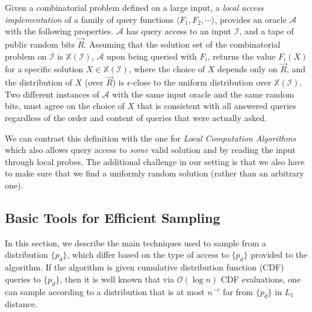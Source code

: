 \begin{definition}
\label{def:local_access_LCA}
Given a combinatorial problem defined on a large input,
a \emph{local access implementation} of a family of query functions $\langle F_1, F_2,\cdots \rangle$,
provides an oracle $\mathcal A$ with the following properties.
$\mathcal A$ has query access to an input $\mathcal I$, and a tape of public random bits $\vec R$.
Assuming that the solution set of the combinatorial problem on $\mathcal I$ is $\mathbb X(\mathcal I)$,
$\mathcal A$ upon being queried with $F_i$, returns the value $F_i(X)$ for a specific solution $X\in\mathbb X(\mathcal I)$,
where the choice of $X$ depends only on $\vec R$,
and the distribution of $X$ (over $\vec R$) is $\epsilon$-close to the uniform distribution over $\mathbb X(\mathcal I)$.
Two different instances of $\mathcal A$ with the same input oracle and the same random bits,
must agree on the choice of $X$ that is consistent with all answered queries regardless of the order and content of queries that were actually asked.
\end{definition}

We can contrast this definition with the one for \emph{Local Computation Algorithms} \cite{LCA, LCA_space_efficient}
which also allows query access to \emph{some} valid solution and by reading the input through local probes.
The additional challenge in our setting is that we also have to make sure that we find a uniformly random solution (rather than an arbitrary one).










\subsection{Basic Tools for Efficient Sampling}
\label{sec:basic_tools_for_efficient_sampling}
In this section, we describe the main techniques used to sample from a distribution $\{ p_d\}$,
which differ based on the type of access to $\{p_d\}$ provided to the algorithm.
If the algorithm is given cumulative distribution function (CDF) queries to $\{p_d\}$,
then it is well known that via $\mathcal O(\log n)$ CDF evaluations, one can sample according
to a distribution that is at most $n^{-c}$ far from $\{p_d\}$ in $L_1$ distance.

